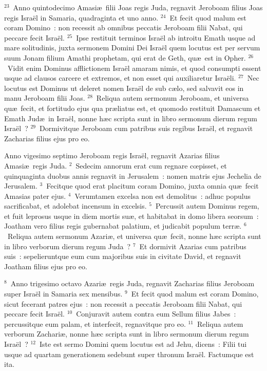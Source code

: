 ${}^{23}$~Anno quintodecimo Amasi\ae\ filii Joas regis Juda, regnavit Jeroboam filius Joas regis Isra\"el in Samaria, quadraginta et uno anno.
${}^{24}$~Et fecit quod malum est coram Domino~: non recessit ab omnibus peccatis Jeroboam filii Nabat, qui peccare fecit Isra\"el.
${}^{25}$~Ipse restituit terminos Isra\"el ab introitu Emath usque ad mare solitudinis, juxta sermonem Domini Dei Isra\"el quem locutus est per servum suum Jonam filium Amathi prophetam, qui erat de Geth, qu\ae\ est in Opher.
${}^{26}$~Vidit enim Dominus afflictionem Isra\"el amaram nimis, et quod consumpti essent usque ad clausos carcere et extremos, et non esset qui auxiliaretur Isra\"eli.
${}^{27}$~Nec locutus est Dominus ut deleret nomen Isra\"el de sub c\ae lo, sed salvavit eos in manu Jeroboam filii Joas.
${}^{28}$~Reliqua autem sermonum Jeroboam, et universa qu\ae\ fecit, et fortitudo ejus qua pr\ae liatus est, et quomodo restituit Damascum et Emath Jud\ae\ in Isra\"el, nonne h\ae c scripta sunt in libro sermonum dierum regum Isra\"el~?
${}^{29}$~Dormivitque Jeroboam cum patribus suis regibus Isra\"el, et regnavit Zacharias filius ejus pro eo.

\bchapter
\lettrine[lines=3,image=true,loversize=0.05,lraise=-0.03]{A}{}nno vigesimo septimo Jeroboam regis Isra\"el, regnavit Azarias filius Amasi\ae\ regis Juda.
${}^{2}$~Sedecim annorum erat cum regnare cœpisset, et quinquaginta duobus annis regnavit in Jerusalem~: nomen matris ejus Jechelia de Jerusalem.
${}^{3}$~Fecitque quod erat placitum coram Domino, juxta omnia qu\ae\ fecit Amasias pater ejus.
${}^{4}$~Verumtamen excelsa non est demolitus~: adhuc populus sacrificabat, et adolebat incensum in excelsis.
${}^{5}$~Percussit autem Dominus regem, et fuit leprosus usque in diem mortis su\ae , et habitabat in domo libera seorsum~: Joatham vero filius regis gubernabat palatium, et judicabit populum terr\ae .
${}^{6}$~Reliqua autem sermonum Azari\ae , et universa qu\ae\ fecit, nonne h\ae c scripta sunt in libro verborum dierum regum Juda~?
${}^{7}$~Et dormivit Azarias cum patribus suis~: sepelieruntque eum cum majoribus suis in civitate David, et regnavit Joatham filius ejus pro eo.


${}^{8}$~Anno trigesimo octavo Azari\ae\ regis Juda, regnavit Zacharias filius Jeroboam super Isra\"el in Samaria sex mensibus.
${}^{9}$~Et fecit quod malum est coram Domino, sicut fecerant patres ejus~: non recessit a peccatis Jeroboam filii Nabat, qui peccare fecit Isra\"el.
${}^{10}$~Conjuravit autem contra eum Sellum filius Jabes~: percussitque eum palam, et interfecit, regnavitque pro eo.
${}^{11}$~Reliqua autem verborum Zachari\ae , nonne h\ae c scripta sunt in libro sermonum dierum regum Isra\"el~?
${}^{12}$~Iste est sermo Domini quem locutus est ad Jehu, dicens~: Filii tui usque ad quartam generationem sedebunt super thronum Isra\"el. Factumque est ita.


